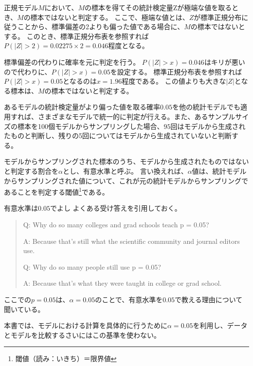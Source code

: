 正規モデル$M$において、$M$の標本を得てその統計検定量Zが極端な値を取るとき、$M$の標本ではないと判定する。
ここで、極端な値とは、$Z$が標準正規分布に従うことから、標準偏差の2よりも偏った値である場合に、$M$の標本ではないとする。
このとき、標準正規分布表を参照すれば$P(|Z|>2)=0.02275\times 2=0.046$程度となる。

標準偏差の代わりに確率を元に判定を行う。
$P(|Z|>x)=0.046$はキリが悪いので代わりに、$P(|Z|>x)=0.05$を設定する。
標準正規分布表を参照すれば$P(|Z|>x)=0.05$となるのは$x=1.96$程度である。
この値よりも大きな$|Z|$となる標本は、$M$の標本ではないと判定する。

あるモデルの統計検定量がより偏った値を取る確率$0.05$を他の統計モデルでも適用すれば、さまざまなモデルで統一的に判定が行える。また、あるサンプルサイズの標本を100個モデルからサンプリングした場合、$95$回はモデルから生成されたものと判断し、残りの5回についてはモデルから生成されていないと判断する。


\begin{defi}
 モデルからサンプリングされた標本のうち、モデルから生成されたものではないと判定する割合を$\alpha$とし、有意水準と呼ぶ。
 言い換えれば、$\alpha$値は、統計モデルからサンプリングされた値について、これが元の統計モデルからサンプリングであることを判定する閾値\footnote{閾値（読み：いきち）＝限界値}である。
\end{defi}



\begin{SMbox}{有意水準は$0.05$でよし}
    よくある受け答えを引用しておく\cite{greenland2016statistical}。
    \begin{quote}
        Q: Why do so many colleges and grad schools teach p = 0.05?

        A: Because that's still what the scientific community and journal editors use.

        Q: Why do so many people still use p = 0.05?

        A: Because that's what they were taught in college or grad school.
    \end{quote}
 ここでの$p=0.05$は、$\alpha=0.05$のことで、有意水準を$0.05$で教える理由について聞いている。

本書では、モデルにおける計算を具体的に行うために$\alpha=0.05$を利用し、データとモデルを比較するさいにはこの基準を使わない。
\end{SMbox}


